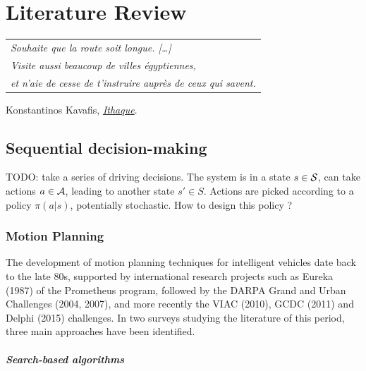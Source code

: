 
\graphicspath{{2-Chapters/2-Chapter/}}

\chapter{Literature Review}
\label{chapter:2}

\begin{flushright}
	\begin{tabular}{@{}l@{}}
		\emph{Souhaite que la route soit longue. [\dots]}\\
		\emph{Visite aussi beaucoup de villes égyptiennes,}\\
		\emph{et n’aie de cesse de t’instruire auprès de ceux qui savent.}\\
	\end{tabular}
	
	Konstantinos Kavafis, \href{https://eleurent.github.io/sisyphe/texts/ithaki.html}{\emph{Ithaque}}.
\end{flushright}

\section{Sequential decision-making}

TODO: take a series of driving decisions. The system is in a state $s\in\mathcal{S}$, can take actions $a\in\mathcal{A}$, leading to another state $s'\in S$. Actions are picked according to a policy $\pi(a|s)$, potentially stochastic. How to design this policy ?

\subsection{Motion Planning}

The development of motion planning techniques for intelligent vehicles date back to the late 80s, supported by international research projects such as Eureka (1987) of the Prometheus program, followed by the DARPA Grand and Urban Challenges (2004, 2007), and more recently the VIAC (2010), GCDC (2011) and Delphi (2015) challenges. In two surveys \citep{Gonzalez2016,Paden2016} studying the literature of this period, three main approaches have been identified.

\paragraph{Search-based algorithms}

